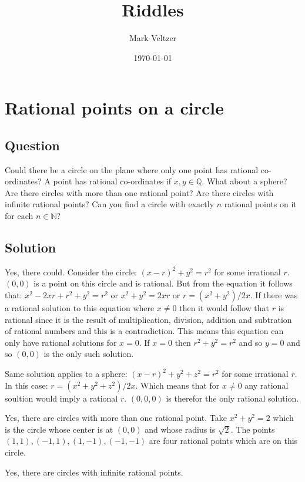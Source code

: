 \documentclass{article}
\title{Riddles}
\author{Mark Veltzer}
\date{\today}
\begin{document}
\maketitle

\section{Rational points on a circle}

\subsection{Question}

Could there be a circle on the plane where only one point has rational co-ordinates? A point has rational co-ordinates if $x,y\in\mathbb{Q}$. What about a sphere? Are there circles with more than one rational point? Are there circles with infinite rational points? Can you find a circle with exactly $n$ rational points on it for each $n\in\mathbb{N}$?

\subsection{Solution}

Yes, there could. Consider the circle: $(x-r)^2+y^2=r^2$ for some irrational $r$.
$(0,0)$ is a point on this circle and is rational. But from the equation it follows
that: $x^2-2xr+r^2+y^2=r^2$ or $x^2+y^2=2xr$ or $r=(x^2+y^2)/2x$. If there
was a rational solution to this equation where $x\ne0$ then it would follow that
$r$ is rational since it is the result of multiplication, division, addition and subtration
of rational numbers and this is a contradiction. This means this equation can only
have rational solutions for $x=0$. If $x=0$ then $r^2+y^2=r^2$ and so $y=0$ and so
$(0,0)$ is the only such solution.

Same solution applies to a sphere: $(x-r)^2+y^2+z^2=r^2$ for some irrational $r$.
In this case: $r=(x^2+y^2+z^2)/2x$. Which means that for $x\ne0$ any rational soultion would imply a rational $r$.
$(0,0,0)$ is therefor the only rational solution.

Yes, there are circles with more than one rational point. Take $x^2+y^2=2$ which is the circle whose
center is at $(0,0)$ and whose radius is $\sqrt{2}$. The points $(1,1),(-1,1),(1,-1),(-1,-1)$ are four rational
points which are on this circle.

Yes, there are circles with infinite rational points.
\end{document}

